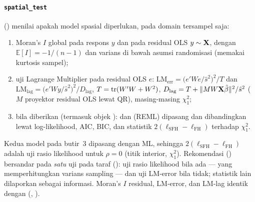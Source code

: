 \paragraph{\texttt{spatial\_test}} () menilai apakah
model spasial diperlukan, pada domain tersampel saja:
\begin{enumerate}[label=\arabic*.]
  \item Moran's $I$ global pada respons $y$ dan pada residual OLS
        $y\sim\mathbf{X}$, dengan $\mathbb E[I]=-1/(n-1)$ dan varians di bawah
        asumsi randomisasi (memakai kurtosis sampel);
  \item uji Lagrange Multiplier \citet{anselin1988spatial} pada residual OLS
        $e$:
        $\mathrm{LM}_{\text{err}}=\bigl(e'We/\hat s^2\bigr)^2/T$ dan
        $\mathrm{LM}_{\text{lag}}=\bigl(e'Wy/\hat s^2\bigr)^2/D_{\text{lag}}$,
        $T=\operatorname{tr}(W'W+W^2)$, $D_{\text{lag}}=T+\lVert M W\mathbf{X}\hat\beta\rVert^2/\hat s^2$
        ($M$ proyektor residual OLS lewat QR), masing-masing $\chi^2_1$;
  \item bila  diberikan (termasuk objek ):
         dan  (REML) dipasang dan dibandingkan
        lewat log-likelihood, AIC, BIC, dan statistik
        $2(\ell_{\text{SFH}}-\ell_{\text{FH}})$ terhadap $\chi^2_1$.
\end{enumerate}
Kedua model pada butir~3 dipasang dengan ML, sehingga
$2(\ell_{\text{SFH}}-\ell_{\text{FH}})$ adalah uji rasio likelihood untuk
$\rho=0$ (titik interior, $\chi^2_1$). Rekomendasi
() bersandar pada \emph{satu} uji pada taraf
 (): uji rasio likelihood bila 
ada --- yang memperhitungkan varians sampling --- dan uji LM-error bila tidak;
statistik lain dilaporkan sebagai informasi. Moran's $I$ residual, LM-error,
dan LM-lag identik dengan  (, ).


